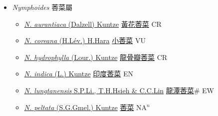 
  \begin{itemize}
 \item[] \textit{Nymphoides} 莕菜屬
                    
  \begin{itemize}
        \item[] \href{http://www.theplantlist.org/tpl1.1/search?q=Nymphoides+aurantiaca}{\textit{N. aurantiaca} (Dalzell) Kuntze}   \href{\detokenize{http://taibnet.sinica.edu.tw/chi/taibnet_species_list.php?T2=黃花莕菜&T2_new_value=true&fr=y}}{黃花莕菜} CR
        \item[] \href{http://www.theplantlist.org/tpl1.1/search?q=Nymphoides+coreana}{\textit{N. coreana} (H.Lév.) H.Hara}   \href{\detokenize{http://taibnet.sinica.edu.tw/chi/taibnet_species_list.php?T2=小莕菜&T2_new_value=true&fr=y}}{小莕菜} VU
        \item[] \href{http://www.theplantlist.org/tpl1.1/search?q=Nymphoides+hydrophylla}{\textit{N. hydrophylla} (Lour.) Kuntze}   \href{\detokenize{http://taibnet.sinica.edu.tw/chi/taibnet_species_list.php?T2=龍骨瓣莕菜&T2_new_value=true&fr=y}}{龍骨瓣莕菜} CR
        \item[] \href{http://www.theplantlist.org/tpl1.1/search?q=Nymphoides+indica}{\textit{N. indica} (L.) Kuntze}   \href{\detokenize{http://taibnet.sinica.edu.tw/chi/taibnet_species_list.php?T2=印度莕菜&T2_new_value=true&fr=y}}{印度莕菜} EN
        \item[] \href{http://www.theplantlist.org/tpl1.1/search?q=Nymphoides+lungtanensis}{\textit{N. lungtanensis} S.P.Li., T.H.Hsieh \& C.C.Lin}   \href{\detokenize{http://taibnet.sinica.edu.tw/chi/taibnet_species_list.php?T2=龍潭莕菜&T2_new_value=true&fr=y}}{龍潭莕菜}\# EW
        \item[] \href{http://www.theplantlist.org/tpl1.1/search?q=Nymphoides+peltata}{\textit{N. peltata} (S.G.Gmel.) Kuntze}   \href{\detokenize{http://taibnet.sinica.edu.tw/chi/taibnet_species_list.php?T2=莕菜&T2_new_value=true&fr=y}}{莕菜} NA$^n$
  \end{itemize}
  \end{itemize}
